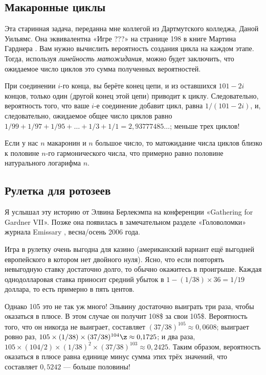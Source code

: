\subsection*{Макаронные циклы}

Эта старинная задача, переданна мне коллегой из Дартмутского колледжа, Даной Уильямс.
Она эквивалентна «Игре ???» на странице 198 в книге Мартина Гарднера \cite{gardner1971}.
Вам нужно вычислить вероятность создания цикла на каждом этапе.
Тогда, используя \emph{линейность матожидания}, можно будет заключить, что ожидаемое число циклов это сумма полученных вероятностей.

При соединении $i$-го конца, вы берёте конец цепи, и из оставшихся $101 - 2i$ концов, только один (другой конец этой цепи) приводит к циклу.
Следовательно, вероятность того, что ваше $i$-е соединение добавит цикл, равна $1/(101 - 2i)$, и, следовательно, ожидаемое общее число циклов равно $1/99 + 1/97 + 1/95 +\dots + 1/3 + 1/1 = 2{,}93777485\dots$; меньше трех циклов!

Если у нас $n$ макаронин и $n$ большое число, то матожидание числа циклов близко к половине $n$-го гармонического числа, что примерно равно половине натурального логарифма $n$.

\subsection*{Рулетка для ротозеев}

Я услышал эту историю от Элвина Берлекэмпа на конференции
«Gathering for Gardner VII».
Позже она появилась в замечательном разделе «Головоломки» журнала Emissary \cite{berlekamp-buhle}, весна/осень 2006 года.

Игра в рулетку очень выгодна для казино (американский вариант ещё выгодней европейского в котором нет двойного нуля).
Ясно, что если повторять невыгодную ставку достаточно долго, то обычно окажитесь в проигрыше.
Каждая однодолларовая ставка приносит средний убыток в  $1 - (1/38) \times 36 = 1/19$ доллара, то есть примерно в пять центов.

Однако 105 это не так уж много!
Эльвину достаточно выиграть три раза, чтобы оказаться в плюсе.
В этом случае он получит 108\$ за свои 105\$.
Вероятность того, что он никогда не выиграет, составляет $(37/38)^{105} \approx 0{,}0608$;
выиграет ровно раз, $105 \times (1/38) \times (37/38)^{104} \z\approx 0{,}1725$;
и два раза, $105 \times (104/2) \times (1/38)^2 \times (37/38)^{103} \approx 0{,}2425$.
Таким образом, вероятность оказаться в плюсе равна единице минус сумма этих трёх значений, что составляет $0{,}5242$ --- больше половины!

